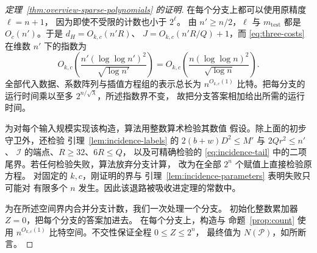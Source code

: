 \begin{proof}[定理~\ref{thm:overview-sparse-polynomials} 的证明]
在每个分支上都可以使用原精度 $\ell=n+1$，
因为即使不受限的计数也小于 $2^\ell$。
由 $n'\ge n/2$，$\ell$ 与 $m_{\mathrm{test}}$
都是 $O_c(n')$。于是 $d_H=O_{k,c}(n'R)$、
$J=O_{k,c}(n'R/Q)+1$，而 \eqref{eq:three-costs}
在维数 $n'$ 下的指数为
\[
 O_{k,c}\!\left(\frac{n'(\log\log n')^2}{\sqrt{\log n'}}\right)
 =O_{k,c}\!\left(\frac{n(\log\log n)^2}{\sqrt{\log n}}\right).
\]
全部代入数据、系数阵列与插值方程组的表示总长为
$n^{O_{k,c}(1)}$ 比特。把每分支的运行时间乘以至多
$2^{n/\sqrt\lambda}$，所述指数界不变，
故把分支答案相加给出所需的运行时间。

为对每个输入规模实现该构造，算法用整数算术检验其数值
假设。除上面的初步守卫外，还检验
引理~\ref{lem:incidence-labels} 的
$2(b+w)D^2\le M'$ 与 $2Qr^2\le n'$、
$\mathcal I$ 的端点、$R\ge32$、$6R\le Q$，
以及可精确检验的 \eqref{eq:incidence-tail}
中的二项尾界。若任何检验失败，算法放弃分支计算，
改为在全部 $2^n$ 个赋值上直接检验原方程。
对固定的 $k,c$，刚证明的界与
引理~\ref{lem:incidence-parameters} 表明失败只可能对
有限多个 $n$ 发生。因此该退路被吸收进定理的常数中。

为在所述空间界内合并分支计数，我们一次处理一个分支。
初始化整数累加器 $Z=0$，把每个分支的答案加进去。
在每个分支上，构造与
命题~\ref{prop:count} 使用 $n^{O_{k,c}(1)}$
比特空间。不交性保证全程 $0\le Z\le2^n$，
最终值为 $N(\mathcal P)$，如所断言。
\end{proof}
